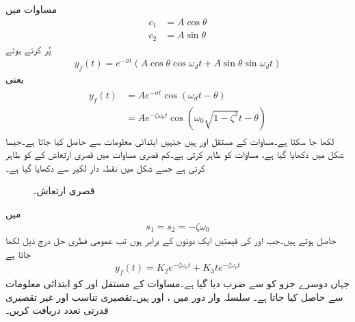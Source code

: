 مساوات  میں
\begin{align*}
c_1&=A \cos \theta\\
c_2&=A\sin \theta
\end{align*}
پُر کرتے ہوئے
\begin{align*}
y_f(t)=e^{-\sigma t} \left(A \cos \theta \cos \omega_d t +A \sin \theta \sin \omega_d t\right)
\end{align*}
یعنی
\begin{gather}
\begin{aligned}\label{مساوات_عارضی_فطری_حل_کم_تقصیر_ب}
y_f(t)&=Ae^{-\sigma t} \cos(\omega_d t -\theta)\\
&=Ae^{-\zeta \omega_0 t} \cos(\omega_0 \sqrt{1-\zeta^2} t-\theta)
\end{aligned}
\end{gather}
لکھا جا سکتا ہے۔مساوات  کے مستقل  اور  ہیں جنہیں ابتدائی معلومات سے حاصل کیا جاتا ہے۔جیسا شکل  میں دکھایا گیا ہے، مساوات    کو ظاہر کرتی ہے۔کم قصری مساوات میں  قصری ارتعاش کے  کو ظاہر کرتی ہے جسے شکل میں نقطہ دار لکیر سے  دکھایا گیا ہے۔
\begin{figure}
\centering
\pgfplotsset{scaled x ticks=false,scaled y ticks=false}
%
\caption{قصری ارتعاش۔}
\label{شکل_عارضی_کم_قصری_فطری_حل}
\end{figure}
  میں
\begin{align}
s_1=s_2=-\zeta \omega_0
\end{align}
حاصل ہوتے ہیں۔جب  اور  کی قیمتیں ایک دونوں کے برابر  ہوں تب عمومی فطری حل درج ذیل لکھا جاتا ہے
\begin{align}\label{مساوات_عارضی_فطری_فاصل_مقصور_حل}
y_f(t)=K_2 e^{-\zeta \omega_0 t}+K_3 t e^{-\zeta \omega_0 t}
\end{align}
جہاں دوسرے جزو کو  سے ضرب دیا گیا ہے۔مساوات کے مستقل  اور  کو ابتدائی معلومات سے حاصل کیا جاتا ہے۔
سلسلہ وار  دور میں ،  اور  ہیں۔تقصیری تناسب اور غیر تقصیری قدرتی تعدد دریافت کریں۔

